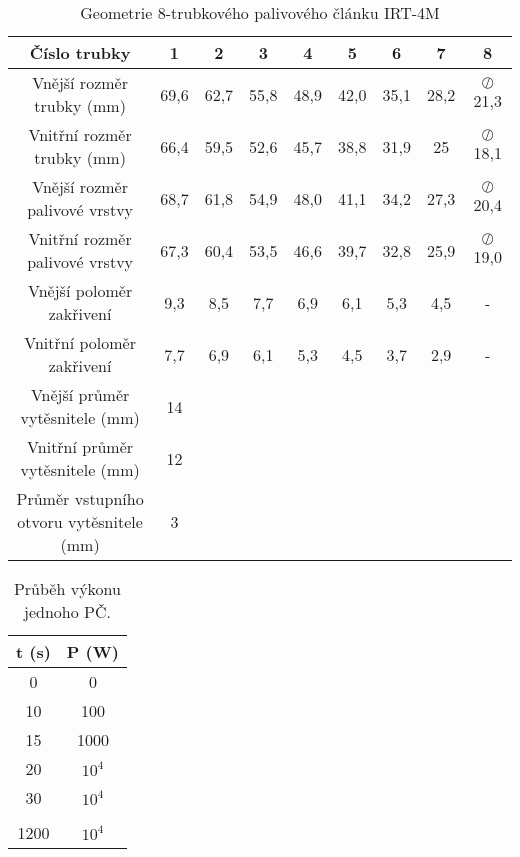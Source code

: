 \begin{table}[H]
	\centering
	\caption{Geometrie 8-trubkového palivového článku IRT-4M \cite{sedlbauer2019}}
	\label{tab:prilohy_irt_geometrie}
	\begin{tabular}{ccccccccc}
		\hline
		Číslo trubky & 1 & 2 & 3 & 4 & 5 & 6 & 7 & 8 \\
		\hline \hline
		Vnější rozměr trubky (mm) & 69,6  & 62,7  & 55,8  & 48,9  & 42,0  & 35,1  & 28,2  & $\oslash$ 21,3 \\
		Vnitřní rozměr trubky (mm)  &   66,4 & 59,5 & 52,6 & 45,7 & 38,8 & 31,9 & 25  & $\oslash$ 18,1 \\
		\hline
		Vnější rozměr palivové vrstvy &  68,7 & 61,8 & 54,9 & 48,0 & 41,1 & 34,2 & 27,3 & $\oslash$ 20,4 \\
		Vnitřní rozměr palivové vrstvy &  67,3 & 60,4 & 53,5 & 46,6 & 39,7 & 32,8 & 25,9 & $\oslash$ 19,0 \\
		\hline
		Vnější poloměr zakřivení & 9,3 & 8,5 & 7,7 & 6,9 & 6,1 & 5,3 & 4,5 & - \\
		Vnitřní poloměr zakřivení & 7,7 & 6,9 & 6,1 & 5,3 & 4,5 & 3,7 & 2,9 & - \\
		\hline
		\hline
		
		Vnější průměr vytěsnitele (mm) & 14 & & & & & & & \\
		Vnitřní průměr vytěsnitele (mm) & 12 & & & & & & & \\
		Průměr vstupního otvoru vytěsnitele (mm) & 3 & & & & & & & \\
		\hline 
		 
	\end{tabular}
\end{table}

\begin{table}[H]
	\centering
	\caption{Průběh výkonu jednoho PČ.}
	\label{tab:vykon_model}
	\begin{tabular}{cc}
		\hline
		t (s) & P (W) \\
		\hline
		
		0  & 0  \\
		10 & 100 \\
		15 & 1000 \\
		20 & $ 10^4 $ \\
		30 & $ 10^4$ \\
		\multicolumn{2}{c}{\textellipsis} \\
		1200 & $ 10^4 $ \\
		\hline
	\end{tabular}
	
	
\end{table}


